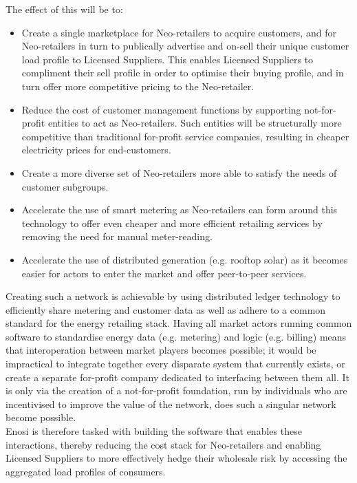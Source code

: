 \documentclass{article}
\theoremstyle{definition}
\theoremstyle{plain} %
\begin{document}
\noindent The effect of this will be to:

\begin{itemize}
\item{Create a single marketplace for Neo-retailers to acquire customers, and for Neo-retailers in turn to publically advertise and on-sell their unique customer load profile to Licensed Suppliers. This enables Licensed Suppliers to compliment their sell profile in order to optimise their buying profile, and in turn offer more competitive pricing to the Neo-retailer.}
\item{Reduce the cost of customer management functions by supporting not-for-profit entities to act as Neo-retailers. Such entities will be structurally more competitive than traditional for-profit service companies, resulting in cheaper electricity prices for end-customers.}
\item{Create a more diverse set of Neo-retailers more able to satisfy the needs of customer subgroups.}
\item{Accelerate the use of smart metering as Neo-retailers can form around this technology to offer even cheaper and more efficient retailing services by removing the need for manual meter-reading.}
\item{Accelerate the use of distributed generation (e.g. rooftop solar) as it becomes easier for actors to enter the market and offer peer-to-peer services.}
\end{itemize} 

\noindent Creating such a network is achievable by using distributed ledger technology to efficiently share metering and customer data as well as adhere to a common standard for the energy retailing stack. Having all market actors running common software to standardise energy data (e.g. metering) and logic (e.g. billing) means that interoperation between market players becomes possible; it would be impractical to integrate together every disparate system that currently exists, or create a separate for-profit company dedicated to interfacing between them all. It is only via the creation of a not-for-profit foundation, run by individuals who are incentivised to improve the value of the network, does such a singular network become possible. \\

\noindent Enosi is therefore tasked with building the software that enables these interactions, thereby reducing the cost stack for Neo-retailers and enabling Licensed Suppliers to more effectively hedge their wholesale risk by accessing the aggregated load profiles of consumers. \\
\end{document}
